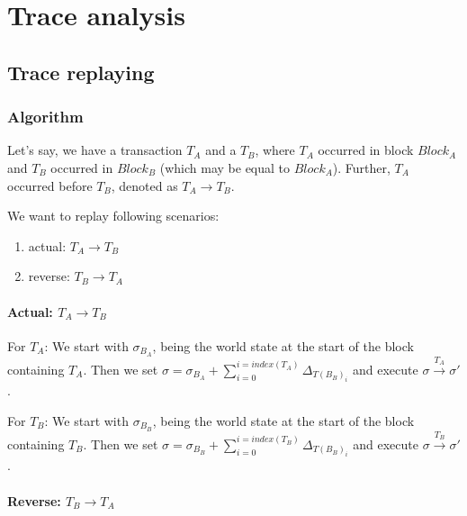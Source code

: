 \documentclass[draft,final]{vutinfth} %
\begin{document}
\chapter{Trace analysis}
\iffalse

    \section{Trace replaying}

    \subsection{Algorithm}

    Let's say, we have a transaction $T_A$ and a $T_B$, where $T_A$ occurred in block $Block_A$ and $T_B$ occurred in $Block_B$ (which may be equal to $Block_A$). Further, $T_A$ occurred before $T_B$, denoted as $T_A \rightarrow T_B$.

    We want to replay following scenarios:

    \begin{enumerate}
        \item actual: $T_A \rightarrow T_B$
        \item reverse: $T_B \rightarrow T_A$
    \end{enumerate}

    \subsubsection{Actual: $T_A \rightarrow T_B$}

    For $T_A$: We start with $\sigma_{B_A}$, being the world state at the start of the block containing $T_A$. Then we set $\sigma = \sigma_{B_A} + \sum_{i=0}^{i=index(T_A)}\Delta_{T(B_B)_i}$ and execute $\sigma \xrightarrow{T_A} \sigma\prime$.

    For $T_B$: We start with $\sigma_{B_B}$, being the world state at the start of the block containing $T_B$. Then we set $\sigma = \sigma_{B_B} + \sum_{i=0}^{i=index(T_B)}\Delta_{T(B_B)_i}$ and execute $\sigma \xrightarrow{T_B} \sigma\prime$.

    \subsubsection{Reverse: $T_B \rightarrow T_A$}
\end{document}
